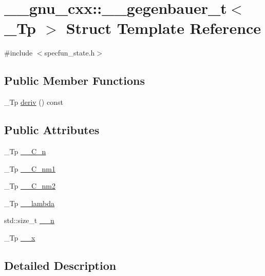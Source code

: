 \hypertarget{struct____gnu__cxx_1_1____gegenbauer__t}{}\section{\+\_\+\+\_\+gnu\+\_\+cxx\+:\+:\+\_\+\+\_\+gegenbauer\+\_\+t$<$ \+\_\+\+Tp $>$ Struct Template Reference}
\label{struct____gnu__cxx_1_1____gegenbauer__t}


{\ttfamily \#include $<$specfun\+\_\+state.\+h$>$}

\subsection*{Public Member Functions}
\begin{DoxyCompactItemize}
\item 
\+\_\+\+Tp \hyperlink{struct____gnu__cxx_1_1____gegenbauer__t_a7f67b4bddba90569373b9a7b67492f08}{deriv} () const
\end{DoxyCompactItemize}
\subsection*{Public Attributes}
\begin{DoxyCompactItemize}
\item 
\+\_\+\+Tp \hyperlink{struct____gnu__cxx_1_1____gegenbauer__t_a84d400a2aa985534a294c1b4c4dedd40}{\+\_\+\+\_\+\+C\+\_\+n}
\item 
\+\_\+\+Tp \hyperlink{struct____gnu__cxx_1_1____gegenbauer__t_a25439e9a062a73760358397e89555ac4}{\+\_\+\+\_\+\+C\+\_\+nm1}
\item 
\+\_\+\+Tp \hyperlink{struct____gnu__cxx_1_1____gegenbauer__t_aa987c8e0fc387d8624b58dbed25e2f68}{\+\_\+\+\_\+\+C\+\_\+nm2}
\item 
\+\_\+\+Tp \hyperlink{struct____gnu__cxx_1_1____gegenbauer__t_a1c91798ec415bb7ff9ae1b9f036a80c3}{\+\_\+\+\_\+lambda}
\item 
std\+::size\+\_\+t \hyperlink{struct____gnu__cxx_1_1____gegenbauer__t_a30aab4b690a4e8e52f228db50cee14d6}{\+\_\+\+\_\+n}
\item 
\+\_\+\+Tp \hyperlink{struct____gnu__cxx_1_1____gegenbauer__t_a937c707f32f6c438db733b911b4f0bdf}{\+\_\+\+\_\+x}
\end{DoxyCompactItemize}


\subsection{Detailed Description}
